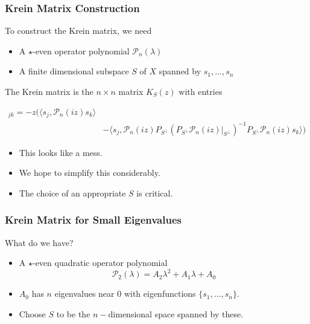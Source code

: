 \documentclass[16pt]{beamer}
\newcommand{\calP}{\mathcal{P}}
\begin{document}
\begin{frame}
\frametitle{Krein Matrix Construction}
	To construct the Krein matrix, we need
	\begin{itemize}
		\item A $\star$-even operator polynomial $\calP_n(\lambda)$
		\item A finite dimensional subspace $S$ of $X$ spanned by $s_1, \dots, s_n$
	\end{itemize}

	The Krein matrix is the $n \times n$ matrix $K_S(z)$ with entries

        \begin{align*}
        [K_S&(z)]_{jk} = -z \Big( 
        \langle s_j , \calP_n(iz)s_k\rangle \\
        &- \langle s_j , \calP_n(iz) P_{S^{\perp}} (P_{S^{\perp}} \calP_n(iz)|_{S^{\perp}} )^{-1} P_{S^{\perp}} \calP_n(iz) s_k \rangle \Big)
        \end{align*}

    \begin{itemize}
    \item<2->This looks like a mess.
    \item<3->We hope to simplify this considerably.
    \item<4->The choice of an appropriate $S$ is critical.
	\end{itemize}
\end{frame}

\begin{frame}
\frametitle{Krein Matrix for Small Eigenvalues}
	What do we have? 
	\begin{itemize}	
	\item A $\star$-even quadratic operator polynomial
	\[ \calP_2(\lambda) = A_2 \lambda^2 + A_1 \lambda + A_0 \]
	\item $A_0$ has $n$ eigenvalues near 0 with eigenfunctions $\{s_1, \dots, s_n \}$.
	\item Choose $S$ to be the $n-$dimensional space spanned by these.
	\end{itemize}
\end{frame}
\end{document}
